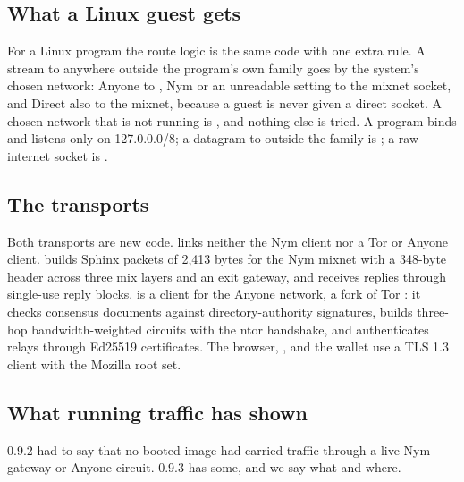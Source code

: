\subsection{What a Linux guest gets}

For a Linux program the route logic is the same code with one extra rule. A stream to anywhere outside the program's own family goes by the system's chosen network: Anyone to , Nym or an unreadable setting to the mixnet socket, and Direct also to the mixnet, because a guest is never given a direct socket. A chosen network that is not running is , and nothing else is tried. A program binds and listens only on 127.0.0.0/8; a datagram to outside the family is ; a raw internet socket is .

\subsection{The transports}

Both transports are new  code. \nonos{} links neither the Nym client nor a Tor or Anyone client.  builds Sphinx \cite{sphinx} packets of 2,413 bytes for the Nym mixnet \cite{nym} with a 348-byte header across three mix layers and an exit gateway, and receives replies through single-use reply blocks.  is a client for the Anyone network, a fork of Tor \cite{tor}: it checks consensus documents against directory-authority signatures, builds three-hop bandwidth-weighted circuits with the ntor handshake, and authenticates relays through Ed25519 certificates. The browser, ,  and the wallet use a  TLS 1.3 client with the Mozilla root set.

\subsection{What running traffic has shown}

0.9.2 had to say that no booted image had carried traffic through a live Nym gateway or Anyone circuit. 0.9.3 has some, and we say what and where.

